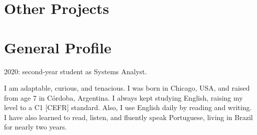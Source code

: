 

\section{Other Projects}

\begin{twenty} %

\end{twenty}

\section{General Profile} %


2020: second-year student as Systems Analyst.

I am adaptable, curious, and tenacious. 
I was born in Chicago, USA, and raised from age 7 in Córdoba, Argentina. 
I always kept studying English, raising my level to a C1 [CEFR] standard.
Also, I use English daily by reading and writing. 
I have also learned to read, listen, and fluently speak Portuguese, living in Brazil for nearly two years.

